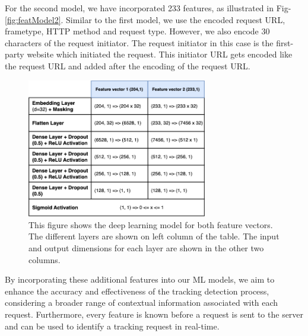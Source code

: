 For the second model, we have incorporated 233 features, as illustrated in Fig-\ref{fig:featModel2}. Similar to the first model,
we use the encoded request URL, frametype, HTTP method and request type. However, we also encode
30 characters of the request initiator. The request initiator in this case is the first-party website which initiated the request. This 
initiator URL gets encoded like the request URL and added after the encoding of the request URL.

\begin{figure}[ht!]
  \begin{center}
    \includegraphics[width=0.7\textwidth]{images/DL.png}
  \end{center}
  \caption{This figure shows the deep learning model for both feature vectors. The different layers are shown on left column of the table. The input
  and output dimensions for each layer are shown in the other two columns.}
  \label{fig:modelStructure}
\end{figure}

By incorporating these additional features into our ML models, we aim to enhance the accuracy and effectiveness of
the tracking detection process, considering a broader range of contextual information associated with each request. 
Furthermore, every feature is known before a request is sent to the server and can be used to identify a tracking request
in real-time.

